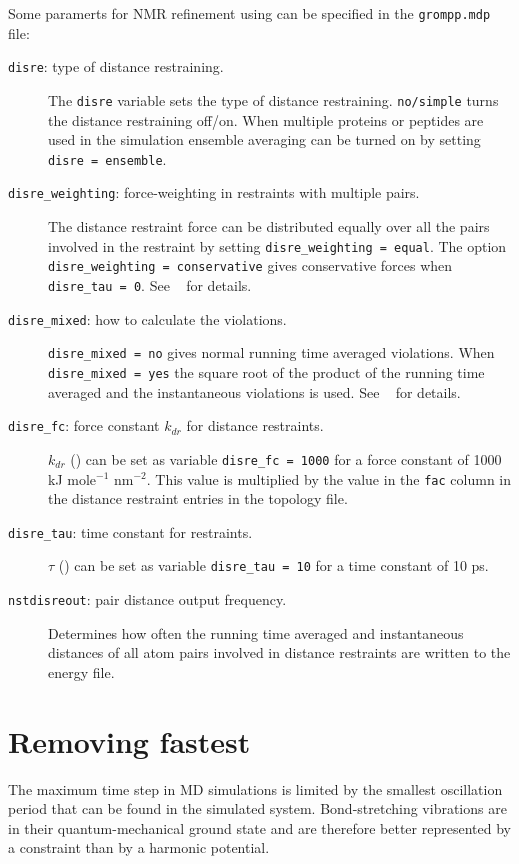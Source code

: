 Some paramerts for NMR refinement using can be specified in the
{\tt grompp.mdp} file:
\begin{description}
\item[{\tt disre}: type of distance restraining.]
	The {\tt disre} variable sets the type of distance restraining.
	{\tt no/simple} turns the distance restraining off/on.
 	When multiple proteins or peptides are used
	in the simulation ensemble averaging 
	can be turned on by setting {\tt disre = ensemble}.
\item[{\tt disre\_weighting}: force-weighting in restraints with
	 multiple pairs.]
	The distance restraint force can be distributed equally
	over all the pairs involved in the restraint by setting
	{\tt disre\_weighting = equal}.
	The option {\tt disre\_weighting = conservative}
	gives conservative forces when {\tt disre\_tau = 0}.
	See ~ for details.
\item[{\tt disre\_mixed}: how to calculate the violations.]
	{\tt disre\_mixed = no} gives normal running time
	averaged violations.
	When {\tt disre\_mixed = yes} the square root of the
	product of the running time averaged and the instantaneous
	violations is used.
	See ~ for details.
\item[{\tt disre\_fc}: force constant $k_{dr}$ for distance restraints.] 
	$k_{dr}$  () can be set
	as variable {\tt disre\_fc = 1000} for a force constant of
	1000 {kJ mole$^{-1}$ nm$^{-2}$}. This value is multiplied by
	the value in the {\tt fac} column in the distance restraint
	entries in the topology file.
\item[{\tt disre\_tau}: time constant for restraints.] 
	$\tau$ () can be set
	as variable {\tt disre\_tau = 10} for a time constant of
	10 ps.
\item[{\tt nstdisreout}: pair distance output frequency.]
	Determines how often the running time averaged and 
	instantaneous distances of all atom pairs involved in
	distance restraints are written to the energy file.
\end{description}

\newcommand{\amine}{\sf -NH$_2$}
\newcommand{\amines}{\sf -NH-}
\newcommand{\aminep}{\sf -NH$_3^+$}
\section{Removing fastest }
The maximum time step in MD simulations is limited by the smallest
oscillation period that can be found in the simulated
system. Bond-stretching vibrations are in their quantum-mechanical
ground state and are therefore better represented by a constraint than
by a harmonic potential.

